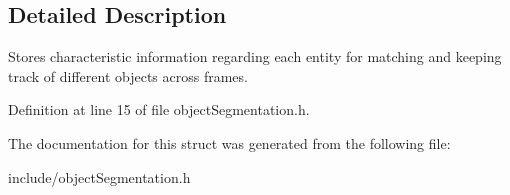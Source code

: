 \subsection{Detailed Description}
Stores characteristic information regarding each entity for matching and keeping track of different objects across frames. 

Definition at line 15 of file object\+Segmentation.\+h.



The documentation for this struct was generated from the following file\+:\begin{DoxyCompactItemize}
\item 
include/object\+Segmentation.\+h\end{DoxyCompactItemize}

